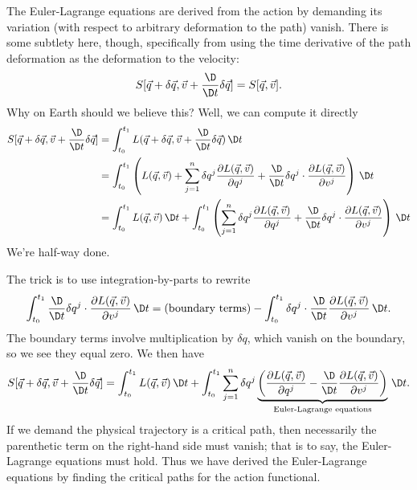The Euler-Lagrange equations are derived from the action by demanding
its variation (with respect to arbitrary deformation to the path)
vanish. There is some subtlety here, though, specifically from using the
time derivative of the path deformation as the deformation to the
velocity:
\begin{equation}
S[\vec{q} + \delta\vec{q}, \vec{v} + \frac{\D}{\D t}\delta\vec{q}]
= S[\vec{q},\vec{v}].
\end{equation}
Why on Earth should we believe this? Well, we can compute it directly
\begin{subequations}
\begin{align}
S[\vec{q} + \delta\vec{q}, \vec{v} + \frac{\D}{\D t}\delta\vec{q}]
&=\int^{t_{1}}_{t_{0}} L(\vec{q} + \delta\vec{q}, \vec{v} + \frac{\D}{\D t}\delta\vec{q})\,\D t\\
&=\int^{t_{1}}_{t_{0}}\left(
L(\vec{q},\vec{v}) + \sum^{n}_{j=1}\delta q^{j}\frac{\partial L(\vec{q},\vec{v})}{\partial q^{j}}
+\frac{\D}{\D t}\delta q^{j}\cdot \frac{\partial L(\vec{q},\vec{v})}{\partial v^{j}}
\right)\,\D t\\
&=\int^{t_{1}}_{t_{0}}L(\vec{q},\vec{v})\,\D t +
\int^{t_{1}}_{t_{0}}\left(\sum^{n}_{j=1}\delta q^{j}\frac{\partial L(\vec{q},\vec{v})}{\partial q^{j}}
+\frac{\D}{\D t}\delta q^{j}\cdot \frac{\partial L(\vec{q},\vec{v})}{\partial v^{j}}
\right)\,\D t
\end{align}
\end{subequations}
We're half-way done.

The trick is to use integration-by-parts to rewrite
\begin{equation}
 \int^{t_{1}}_{t_{0}}
  \frac{\D}{\D t}\delta q^{j}\cdot \frac{\partial L(\vec{q},\vec{v})}{\partial v^{j}}\,\D t
  = (\mbox{boundary terms}) -
  \int^{t_{1}}_{t_{0}}
  \delta q^{j}\cdot \frac{\D}{\D t}\frac{\partial L(\vec{q},\vec{v})}{\partial v^{j}}\,\D t.
\end{equation}
The boundary terms involve multiplication by $\delta q$, which vanish on
the boundary, so we see they equal zero. We then have
\begin{equation}
S[\vec{q} + \delta\vec{q}, \vec{v} + \frac{\D}{\D t}\delta\vec{q}]
=\int^{t_{1}}_{t_{0}}L(\vec{q},\vec{v})\,\D t +
\int^{t_{1}}_{t_{0}}\sum^{n}_{j=1}\delta q^{j}\underbrace{\left(\frac{\partial L(\vec{q},\vec{v})}{\partial q^{j}}
-\frac{\D}{\D t}\frac{\partial L(\vec{q},\vec{v})}{\partial v^{j}}
\right)}_{\text{Euler-Lagrange equations}}\,\D t.
\end{equation}
If we demand the physical trajectory is a critical path, then
necessarily the parenthetic term on the right-hand side must vanish;
that is to say, the Euler-Lagrange equations must hold.
Thus we have derived the Euler-Lagrange equations by finding the
critical paths for the action functional.

